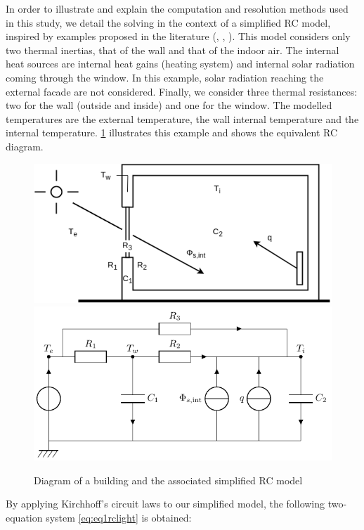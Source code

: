 \documentclass[11pt]{article}
\begin{document}
        In order to illustrate and explain the computation and resolution methods used in this study, we detail the solving in the context of a simplified RC model, inspired by examples proposed in the literature (\cite{madsen_estimation_1995}, \cite{bacher_identifying_2011}, \cite{rouchier_solving_2018}). This model considers only two thermal inertias, that of the wall and that of the indoor air. The internal heat sources are internal heat gains (heating system) and internal solar radiation coming through the window. In this example, solar radiation reaching the external facade are not considered. Finally, we consider three thermal resistances: two for the wall (outside and inside) and one for the window. The modelled temperatures are the external temperature, the wall internal temperature and the internal temperature. \ref{fig:RClight} illustrates this example and shows the equivalent RC diagram. 

        \begin{figure}[ht]
            \centering
            \includegraphics[width=0.49\columnwidth]{figures/R3C2_diagram.drawio.png}
            \includegraphics[width=0.49\columnwidth]{figures/R3C2.pdf}
            \caption{\label{fig:RClight} Diagram of a building and the associated simplified RC model}
         \end{figure}

        By applying Kirchhoff's circuit laws to our simplified model, the following two-equation system \eqref{eq:eq1rclight} is obtained: 
\end{document}
